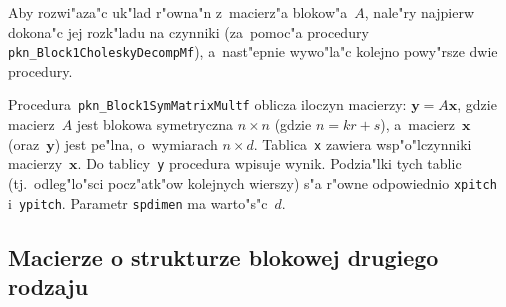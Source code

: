 Aby rozwi"aza"c uk"lad r"owna"n z~macierz"a blokow"a~$A$, nale"ry najpierw
dokona"c jej rozk"ladu na czynniki (za~pomoc"a procedury
\texttt{pkn\_Block1CholeskyDecompMf}), a~nast"epnie wywo"la"c kolejno
powy"rsze dwie procedury.

\vspace{\bigskipamount}
Procedura~\texttt{pkn\_Block1SymMatrixMultf} oblicza iloczyn macierzy:
$\bm{y}=A\bm{x}$, gdzie macierz~$A$ jest blokowa symetryczna $n\times n$
(gdzie $n=kr+s$), a~macierz~$\bm{x}$ (oraz~$\bm{y}$) jest pe"lna, o~wymiarach
$n\times d$. Tablica~\texttt{x} zawiera wsp"o"lczynniki macierzy~$\bm{x}$.
Do tablicy~\texttt{y} procedura wpisuje wynik. Podzia"lki tych tablic
(tj.\ odleg"lo"sci pocz"atk"ow kolejnych wierszy) s"a r"owne odpowiednio
\texttt{xpitch} i~\texttt{ypitch}. Parametr \texttt{spdimen} ma warto"s"c~$d$.


\newpage
\subsection{Macierze o strukturze blokowej drugiego rodzaju}

